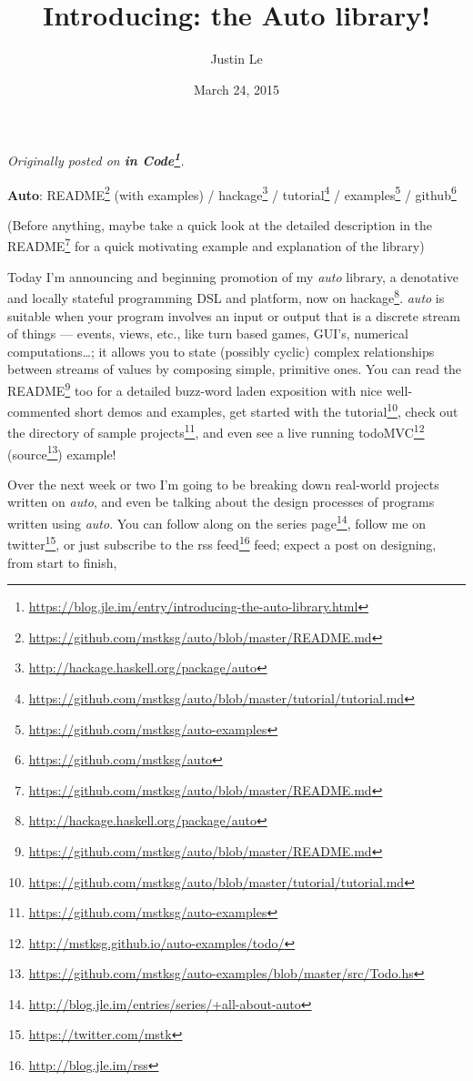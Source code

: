 \documentclass[]{article}
\title{Introducing: the Auto library!}
\author{Justin Le}
\date{March 24, 2015}
\renewcommand{\href}[2]{#2\footnote{\url{#1}}}
\begin{document}
\maketitle

\emph{Originally posted on
\textbf{\href{https://blog.jle.im/entry/introducing-the-auto-library.html}{in
Code}}.}

\textbf{Auto}:
\href{https://github.com/mstksg/auto/blob/master/README.md}{README} (with
examples) / \href{http://hackage.haskell.org/package/auto}{hackage} /
\href{https://github.com/mstksg/auto/blob/master/tutorial/tutorial.md}{tutorial}
/ \href{https://github.com/mstksg/auto-examples}{examples} /
\href{https://github.com/mstksg/auto}{github}

(Before anything, maybe take a quick look at the detailed description in the
\href{https://github.com/mstksg/auto/blob/master/README.md}{README} for a quick
motivating example and explanation of the library)

Today I'm announcing and beginning promotion of my \emph{auto} library, a
denotative and locally stateful programming DSL and platform, now
\href{http://hackage.haskell.org/package/auto}{on hackage}. \emph{auto} is
suitable when your program involves an input or output that is a discrete stream
of things --- events, views, etc., like turn based games, GUI's, numerical
computations\ldots{}; it allows you to state (possibly cyclic) complex
relationships between streams of values by composing simple, primitive ones. You
can read the \href{https://github.com/mstksg/auto/blob/master/README.md}{README}
too for a detailed buzz-word laden exposition with nice well-commented short
demos and examples, get started with
\href{https://github.com/mstksg/auto/blob/master/tutorial/tutorial.md}{the
tutorial}, check out the directory of
\href{https://github.com/mstksg/auto-examples}{sample projects}, and even see a
live running \href{http://mstksg.github.io/auto-examples/todo/}{todoMVC}
(\href{https://github.com/mstksg/auto-examples/blob/master/src/Todo.hs}{source})
example!

Over the next week or two I'm going to be breaking down real-world projects
written on \emph{auto}, and even be talking about the design processes of
programs written using \emph{auto}. You can follow along on
\href{http://blog.jle.im/entries/series/+all-about-auto}{the series page},
follow me on \href{https://twitter.com/mstk}{twitter}, or just subscribe to the
\href{http://blog.jle.im/rss}{rss feed} feed; expect a post on designing, from
start to finish,
\end{document}
